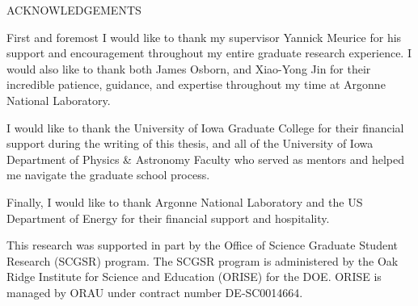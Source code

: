 \begin{doublespace}
\begin{tightcenter}
ACKNOWLEDGEMENTS
\mylinespacing%
\end{tightcenter}

First and foremost I would like to thank my supervisor Yannick Meurice for his  support and encouragement throughout my
entire graduate research experience.
%
I would also like to thank both James Osborn, and Xiao-Yong Jin for their incredible patience, guidance, and expertise
throughout my time at Argonne National Laboratory.

I would like to thank the University of Iowa Graduate College for their financial support during the writing
of this thesis, and all of the University of Iowa Department of Physics \& Astronomy Faculty who served as mentors and
helped me navigate the graduate school process.

Finally, I would like to thank Argonne National Laboratory and the US Department of Energy for their financial support
and hospitality.

This research was supported in part by the Office of Science Graduate Student Research (SCGSR) program. The SCGSR
program is administered by the Oak Ridge Institute for Science and Education (ORISE) for the DOE. ORISE is managed by
ORAU under contract number DE‐SC0014664.



\end{doublespace}

